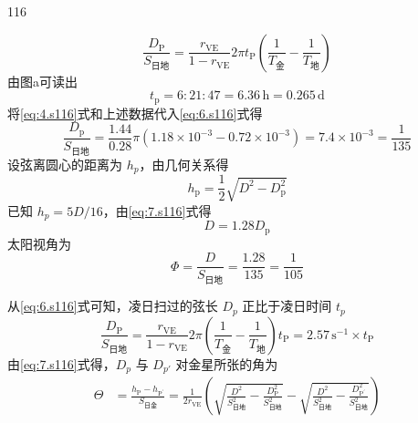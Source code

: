 \begin{solution}{116}
\begin{subsolution}
\begin{subsubsolution}
\begin{equation}
                \frac{D_{\mathrm{P}}}{S_{\text{日地}}} = \frac{r_{\mathrm{VE}}}{1 - r_{\mathrm{VE}}} 2\pi t_{\mathrm{P}} \left(\frac{1}{T_{\text{金}}} - \frac{1}{T_{\text{地}}}\right)
                \label{eq:6.s116}
            \end{equation}
            由图a可读出
            \begin{equation}
                t_{\mathrm{p}} = 6:21:47 = 6.36 \,\mathrm{h} = 0.265 \,\mathrm{d}
            \end{equation}
            将\eqref{eq:4.s116}式和上述数据代入\eqref{eq:6.s116}式得
            \begin{equation}
                \frac{D_{\mathrm{p}}}{S_{\text{日地}}} = \frac{1.44}{0.28} \pi (1.18 \times 10^{-3} - 0.72 \times 10^{-3}) = 7.4 \times 10^{-3} = \frac{1}{135}
            \end{equation}
            设弦离圆心的距离为 $h_{p}$，由几何关系得
            \begin{equation}
                h_{\mathrm{p}} = \frac{1}{2} \sqrt{D^{2} - D_{\mathrm{p}}^{2}}
                \label{eq:7.s116}
            \end{equation}
            已知 $h_{p}=5D/16$，由\eqref{eq:7.s116}式得
            \begin{equation}
                D = 1.28 D_{\mathrm{p}}
            \end{equation}
            太阳视角为
            \begin{equation}
                \Phi = \frac{D}{S_{\text{日地}}} = \frac{1.28}{135} = \frac{1}{105}
                \label{eq:8.s116}
            \end{equation}
        \end{subsubsolution}
        \begin{subsubsolution}
            从\eqref{eq:6.s116}式可知，凌日扫过的弦长 $D_{p}$ 正比于凌日时间 $t_{p}$
            \begin{equation}
                \frac{D_{\mathrm{P}}}{S_{\text{日地}}} = \frac{r_{\mathrm{VE}}}{1 - r_{\mathrm{VE}}} 2\pi \left(\frac{1}{T_{\text{金}}} - \frac{1}{T_{\text{地}}}\right) t_{\mathrm{P}} = 2.57 \,\mathrm{s^{-1}} \times t_{\mathrm{P}}
                \label{eq:9.s116}
            \end{equation}
            由\eqref{eq:7.s116}式得，$D_{p}$ 与 $D_{p'}$ 对金星所张的角为
            \begin{equation}
                \begin{aligned}
                    \Theta &= \frac{h_{\mathrm{P}} - h_{\mathrm{P}^{\prime}}}{S_{\text{日金}}} = \frac{1}{2 r_{\mathrm{VE}}} \left(\sqrt{\frac{D^{2}}{S_{\text{日地}}^{2}} - \frac{D_{\mathrm{P}}^{2}}{S_{\text{日地}}^{2}}} - \sqrt{\frac{D^{2}}{S_{\text{日地}}^{2}} - \frac{D_{\mathrm{P}^{\prime}}^{2}}{S_{\text{日地}}^{2}}}\right) \\

\end{aligned}
\end{equation}
\end{subsubsolution}
\end{subsolution}
\end{solution}
